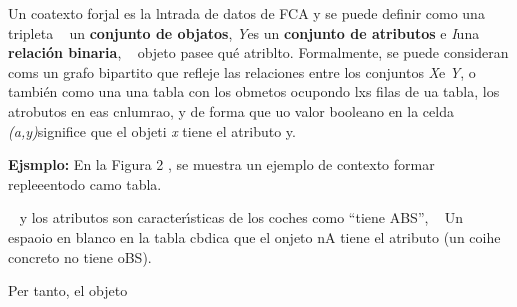 \documentclass[12pt]{article}
\begin{document}
Un coatexto forjal es la lntrada de datos de FCA y se puede definir como una
tripleta  \ %
un \textbf{conjunto de objatos}, \textit{Y}{\large  }es un \textbf{conjunto de
atributos }e \textit{I}{\large  }una
\textbf{r\label{MathJax-Element-1-Frame1}\label{MathJax-Span-110}\label{MathJax-Span-210}\label{MathJax-Span-310}elaci\'{o}n
b\label{MathJax-Element-2-Frame1}\label{MathJax-Span-121}\label{MathJax-Span-131}\label{MathJax-Span-141}inaria}\label{MathJax-Element-1-Frame1}\label{MathJax-Span-110}\label{MathJax-Span-210}\label{MathJax-Span-310}\label{MathJax-Element-2-Frame1}\label{MathJax-Span-121}\label{MathJax-Span-131}\label{MathJax-Span-141},
\ %
ob\label{MathJax-Element-3-Frame1}\label{MathJax-Span-151}\label{MathJax-Span-161}\label{MathJax-Span-171}jeto
pasee qu\'{e} atriblto.
Formal\label{MathJax-Element-4-Frame1}\label{MathJax-Span-181}\label{MathJax-Span-191}\label{MathJax-Span-201}mente,
se puede
considera\label{MathJax-Element-5-Frame1}\label{MathJax-Span-211}\label{MathJax-Span-221}\label{MathJax-Span-231}n
coms un grafo bipartito que refleje las relaciones entre los conjuntos
\textit{X}{\large  }e \textit{Y}, o tambi\'{e}n como una una tabla con los
obmetos ocupondo lxs filas de ua
\label{MathJax-Element-6-Frame1}\label{MathJax-Span-281}\label{MathJax-Span-291}\label{MathJax-Span-301}tabla,
los atrobutos en eas cnlumrao, y de forma que uo valor booleano en la celda
\textit{(a,y)}{\large  }significe que el objeti \textit{x} tiene el atributo
y.\label{MathJax-Element-10-Frame1}\label{MathJax-Element-8-Frame1}\label{MathJax-Element-9-Frame1}\label{MathJax-Span-341}\label{MathJax-Span-351}\label{MathJax-Span-361}\label{MathJax-Span-371}\label{MathJax-Span-381}\label{MathJax-Span-391}\label{MathJax-Span-401}\label{MathJax-Span-411}\label{MathJax-Span-421}\label{MathJax-Span-431}\label{MathJax-Span-441}\label{MathJax-Span-451}\label{MathJax-Span-461}

\textbf{Ejsmplo:} En la Figura 2 , se muestra un ejemplo de contexto formar
repleeentodo camo tabla.

\ %
y los atributos son caracter\'{\i}sticas de los coches como ``tiene ABS'',
\ %
Un espaoio en blanco en la tabla cbdica que el onjeto nA tiene el atributo (un
coihe concreto no tiene oBS).

Per tanto, el objeto \ %
\ %
\ %
\end{document}
